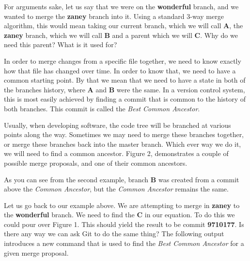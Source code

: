 
For arguments sake, let us say that we were on the \textbf{wonderful} branch, and we wanted to merge the \textbf{zaney} branch into it.
Using a standard 3-way merge algorithm, this would mean taking our current branch, which we will call \textbf{A}, the \textbf{zaney} branch, which we will call \textbf{B} and a parent which we will \textbf{C}.
Why do we need this parent? What is it used for?

In order to merge changes from a specific file together, we need to know exactly how that file has changed over time.
In order to know that, we need to have a common starting point.
By that we mean that we need to have a state in both of the branches history, where \textbf{A} and \textbf{B} were the same.
In a version control system, this is most easily achieved by finding a commit that is common to the history of both branches.
This commit is called the \emph{Best Common Ancestor}.

Usually, when developing software, the code tree will be branched at various points along the way.
Sometimes we may need to merge these branches together, or merge these branches back into the master branch.
Which ever way we do it, we will need to find a common ancestor.
Figure 2, demonstrates a couple of possible merge proposals, and one of their common ancestors.


As you can see from the second example, branch \textbf{B} was created from a commit above the \emph{Common Ancestor}, but the \emph{Common Ancestor} remains the same.

Let us go back to our example above.
We are attempting to merge in \textbf{zaney} to the \textbf{wonderful} branch.
We need to find the \textbf{C} in our equation.
To do this we could pour over Figure 1.
This should yield the result to be commit \textbf{9710177}.
Is there any way we can ask Git to do the same thing? The following output introduces a new command that is used to find the \emph{Best Common Ancestor} for a given merge proposal.


